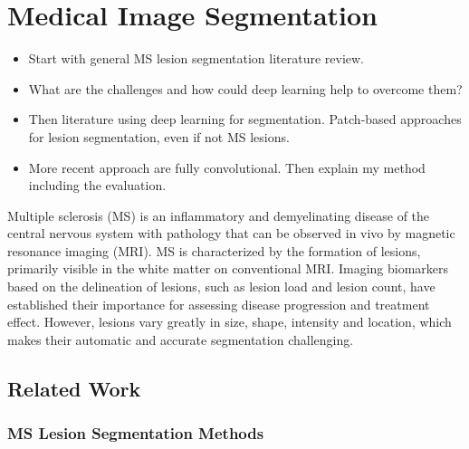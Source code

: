 \chapter{Medical Image Segmentation}
\label{sec:segmentation}

\begin{itemize}
\item 
Start with general MS lesion segmentation
literature review.
\item What are the challenges and how could deep learning help to
overcome them?
\item Then literature using deep learning for segmentation.
Patch-based approaches for lesion segmentation, even if not MS lesions.
\item More recent approach are fully convolutional. Then explain my method
including the evaluation.
\end{itemize}


Multiple sclerosis (MS) is an inflammatory and demyelinating disease of the
central nervous system with pathology that can be observed in vivo by magnetic
resonance imaging (MRI). MS is characterized by the formation of lesions,
primarily visible in the white matter on conventional MRI. Imaging biomarkers
based on the delineation of lesions, such as lesion load and lesion count, have
established their importance for assessing disease progression and treatment
effect. However, lesions vary greatly in size, shape, intensity and location,
which makes their automatic and accurate segmentation challenging.

\section{Related Work}

\subsection{MS Lesion Segmentation Methods}

